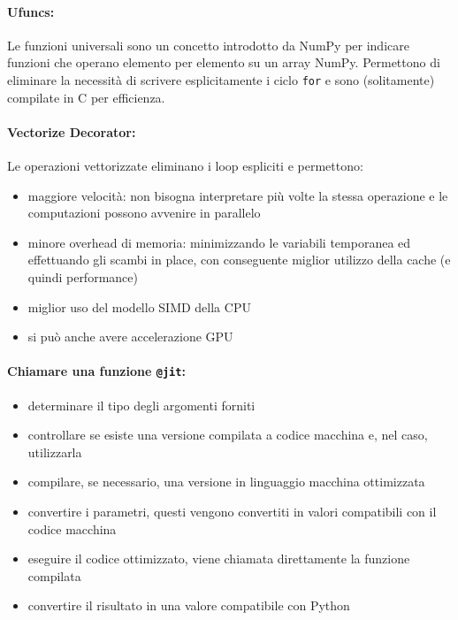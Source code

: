 \paragraph{Ufuncs:} Le funzioni universali sono un concetto introdotto da NumPy per indicare funzioni che operano elemento per elemento su un array NumPy. Permettono di eliminare la necessità di scrivere esplicitamente i ciclo \texttt{for} e sono (solitamente) compilate in C per efficienza. 

\paragraph{Vectorize Decorator:} Le operazioni vettorizzate eliminano i loop espliciti e permettono: 
\begin{itemize}
	\item maggiore velocità: non bisogna interpretare più volte la stessa operazione e le computazioni possono avvenire in parallelo
	
	\item minore overhead di memoria: minimizzando le variabili temporanea ed effettuando gli scambi in place, con conseguente miglior utilizzo della cache (e quindi performance)
	
	\item miglior uso del modello SIMD della CPU
	
	\item si può anche avere accelerazione GPU
\end{itemize}

\paragraph{Chiamare una funzione \texttt{@jit}:} 
\begin{itemize}
	\item determinare il tipo degli argomenti forniti
	
	\item controllare se esiste una versione compilata a codice macchina e, nel caso, utilizzarla
	
	\item compilare, se necessario, una versione in linguaggio macchina ottimizzata
	
	\item convertire i parametri, questi vengono convertiti in valori compatibili con il codice macchina
	
	\item eseguire il codice ottimizzato, viene chiamata direttamente la funzione compilata
	
	\item convertire il risultato in una valore compatibile con Python
\end{itemize}

